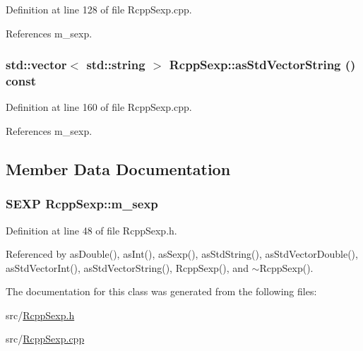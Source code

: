 Definition at line 128 of file RcppSexp.cpp.

References m\_\-sexp.\hypertarget{classRcppSexp_a74c199ef6a4a954ebe035a0951d303a3}{
\subsubsection[{asStdVectorString}]{\setlength{\rightskip}{0pt plus 5cm}std::vector$<$ std::string $>$ RcppSexp::asStdVectorString () const}}
\label{classRcppSexp_a74c199ef6a4a954ebe035a0951d303a3}


Definition at line 160 of file RcppSexp.cpp.

References m\_\-sexp.

\subsection{Member Data Documentation}
\hypertarget{classRcppSexp_ae6b936d1ab1f79174904005a330fd904}{
\subsubsection[{m\_\-sexp}]{\setlength{\rightskip}{0pt plus 5cm}SEXP {\bf RcppSexp::m\_\-sexp}}}
\label{classRcppSexp_ae6b936d1ab1f79174904005a330fd904}


Definition at line 48 of file RcppSexp.h.

Referenced by asDouble(), asInt(), asSexp(), asStdString(), asStdVectorDouble(), asStdVectorInt(), asStdVectorString(), RcppSexp(), and $\sim$RcppSexp().

The documentation for this class was generated from the following files:\begin{DoxyCompactItemize}
\item 
src/\hyperlink{RcppSexp_8h}{RcppSexp.h}\item 
src/\hyperlink{RcppSexp_8cpp}{RcppSexp.cpp}\end{DoxyCompactItemize}
